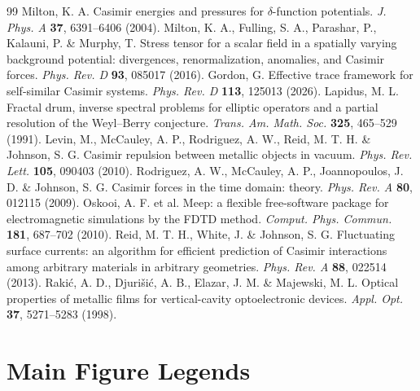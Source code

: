\documentclass[11pt, a4paper]{article}
\begin{document}
\begin{thebibliography}{99}
 Milton, K. A. Casimir energies and pressures for $\delta$-function potentials. \textit{J. Phys. A} \textbf{37}, 6391--6406 (2004).
 Milton, K. A., Fulling, S. A., Parashar, P., Kalauni, P. \& Murphy, T. Stress tensor for a scalar field in a spatially varying background potential: divergences, renormalization, anomalies, and Casimir forces. \textit{Phys. Rev. D} \textbf{93}, 085017 (2016).
 Gordon, G. Effective trace framework for self-similar Casimir systems. \textit{Phys. Rev. D} \textbf{113}, 125013 (2026).
 Lapidus, M. L. Fractal drum, inverse spectral problems for elliptic operators and a partial resolution of the Weyl--Berry conjecture. \textit{Trans. Am. Math. Soc.} \textbf{325}, 465--529 (1991).
 Levin, M., McCauley, A. P., Rodriguez, A. W., Reid, M. T. H. \& Johnson, S. G. Casimir repulsion between metallic objects in vacuum. \textit{Phys. Rev. Lett.} \textbf{105}, 090403 (2010).
 Rodriguez, A. W., McCauley, A. P., Joannopoulos, J. D. \& Johnson, S. G. Casimir forces in the time domain: theory. \textit{Phys. Rev. A} \textbf{80}, 012115 (2009).
 Oskooi, A. F. et al. Meep: a flexible free-software package for electromagnetic simulations by the FDTD method. \textit{Comput. Phys. Commun.} \textbf{181}, 687--702 (2010).
 Reid, M. T. H., White, J. \& Johnson, S. G. Fluctuating surface currents: an algorithm for efficient prediction of Casimir interactions among arbitrary materials in arbitrary geometries. \textit{Phys. Rev. A} \textbf{88}, 022514 (2013).
 Raki\'c, A. D., Djuri\v{s}i\'c, A. B., Elazar, J. M. \& Majewski, M. L. Optical properties of metallic films for vertical-cavity optoelectronic devices. \textit{Appl. Opt.} \textbf{37}, 5271--5283 (1998).
\end{thebibliography}

\clearpage
\section*{Main Figure Legends}
\end{document}
